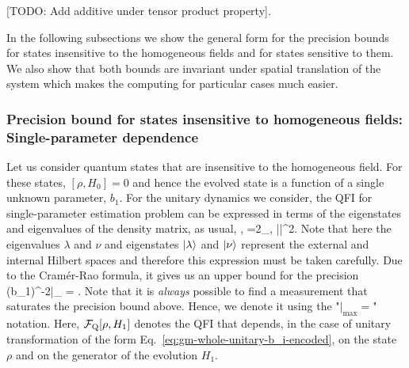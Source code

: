 [TODO: Add additive under tensor product property].
\be
  \label{eq:gm-FAB-additive-under-tensor}
\ee

In the following subsections we show the general form for the precision bounds for states insensitive to the homogeneous fields and for states sensitive to them. We also show that both bounds are invariant under spatial translation of the system which makes the computing for particular cases much easier.

\subsubsection{Precision bound  for states insensitive to homogeneous fields:
Single-parameter dependence}

Let us consider quantum states that are  insensitive to the homogeneous field.
For these states, $[\rho, H_0]=0$ and hence the evolved state is a function of a single unknown parameter, $b_1$.
For the unitary dynamics we consider, the QFI for single-parameter estimation problem can be expressed in terms of the eigenstates and eigenvalues of the density matrix, as usual, \cite{Paris2009,Braunstein1994,Holevo1982,Helstrom1976,Petz2002,Petz2008},
\be
  \label{eq:gm-general one parameter quantum fisher information}
  =2\sum_{\lambda,\nu}  ||^2.
\ee
Note that here the eigenvalues $\lambda$ and $\nu$ and eigenstates $\vert{\lambda}\rangle$ and $\vert{\nu}\rangle$ represent the external and internal Hilbert spaces and therefore this expression must be taken carefully.
Due to the Cram\'er-Rao formula, it gives us an upper
bound for the precision
\be
  \label{eq:gm-one parameter precision bound}
  (\Delta b_1)^{-2}|_{\max} = .
\ee
Note that it is \emph{always} possible to find a measurement that saturates the precision bound above.
Hence, we denote it using the "$|_{\max} = $" notation.
Here, $\mathcal{F}_{\textnormal{Q}}[{\textstyle \rho,H_1}]$ denotes the QFI that depends, in the case of unitary transformation of the form Eq.~\eqref{eq:gm-whole-unitary-b_i-encoded}, on the state $\rho$ and on the generator of the evolution $H_1$.

